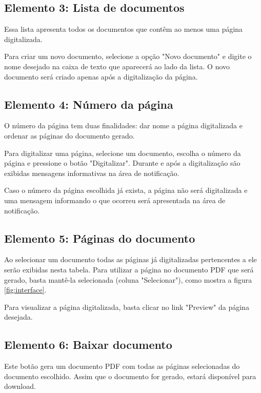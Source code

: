 \subsection{Elemento 3: Lista de documentos}
Essa lista apresenta todos os documentos que contêm ao menos
uma página digitalizada. 

Para criar um novo documento, selecione a opção "Novo documento" e
digite o nome desejado na caixa de texto
que aparecerá ao lado da lista. O novo documento será criado
apenas após a digitalização da página. 

\subsection{Elemento 4: Número da página}
O número da página tem duas finalidades: dar nome a página digitalizada e
ordenar as páginas do documento gerado.

Para digitalizar uma página, selecione um documento, escolha o número da 
página e pressione o botão "Digitalizar". Durante e após a digitalização
são exibidas mensagens informativas na área de notificação.

Caso o número da página escolhida já exista, a página não será digitalizada
e uma mensagem informando o que ocorreu será apresentada na área de 
notificação.

\subsection{Elemento 5: Páginas do documento}
Ao selecionar um documento todas as páginas já digitalizadas pertencentes a
ele serão exibidas nesta tabela. Para utilizar a página no documento PDF que
será gerado, basta mantê-la selecionada (coluna "Selecionar"), como mostra a 
figura \ref{fig:interface}.

Para visualizar a página digitalizada, basta clicar no link "Preview" da página
desejada.

\subsection{Elemento 6: Baixar documento}
Este botão gera um documento PDF com todas as páginas selecionadas do 
documento escolhido. Assim que o documento for gerado, estará disponível 
para download.



